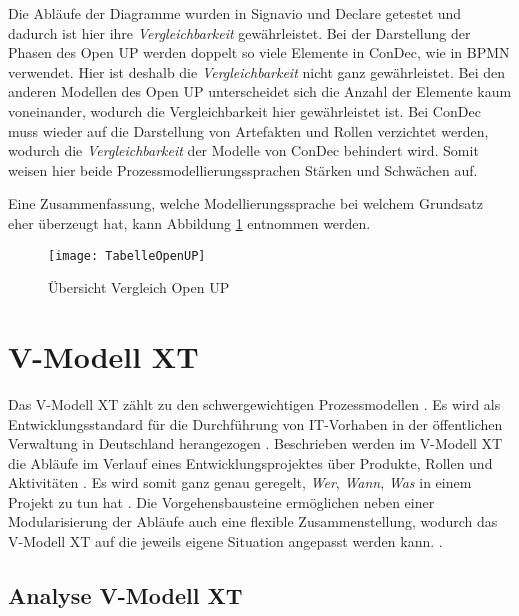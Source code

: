 Die Abläufe der Diagramme wurden in Signavio und Declare getestet und dadurch ist hier ihre \textit{Vergleichbarkeit} gewährleistet.\newline
Bei der Darstellung der Phasen des Open UP werden doppelt so viele Elemente in ConDec, wie in BPMN verwendet. Hier ist deshalb die \textit{Vergleichbarkeit} nicht ganz gewährleistet. Bei den anderen Modellen des Open UP unterscheidet sich die Anzahl der Elemente kaum voneinander, wodurch die Vergleichbarkeit hier gewährleistet ist. \newline
Bei ConDec muss wieder auf die Darstellung von Artefakten und Rollen verzichtet werden, wodurch die \textit{Vergleichbarkeit} der Modelle von ConDec behindert wird. Somit weisen hier beide Prozessmodellierungssprachen Stärken und Schwächen auf.\newline

Eine Zusammenfassung, welche Modellierungssprache bei welchem Grundsatz eher überzeugt hat, kann Abbildung \ref{fig:TabelleOpenUP} entnommen werden. \newline


\begin{figure}[htp]
\begin{center}
  \texttt{[image: TabelleOpenUP]} %
  \caption{Übersicht Vergleich Open UP}
  \label{fig:TabelleOpenUP}
\end{center}
\end{figure}


\section{V-Modell XT}


Das V-Modell XT zählt zu den schwergewichtigen Prozessmodellen \cite{Hanser2010}. Es wird als Entwicklungsstandard für die Durchführung von IT-Vorhaben in der öffentlichen Verwaltung in Deutschland herangezogen \cite{Kuhrmann2011}. Beschrieben werden im V-Modell XT die Abläufe im Verlauf eines Entwicklungsprojektes über Produkte, Rollen und Aktivitäten \cite{Friedrich2008}. Es wird somit ganz genau geregelt, \textit{Wer}, \textit{Wann}, \textit{Was} in einem Projekt zu tun hat \cite{2004vmodell}. Die Vorgehensbausteine ermöglichen neben einer Modularisierung der Abläufe auch eine flexible Zusammenstellung, wodurch das V-Modell XT auf die jeweils eigene Situation angepasst werden kann. \cite{Friedrich2008,Zoerner2012}. \newline
\subsection{Analyse V-Modell XT}

